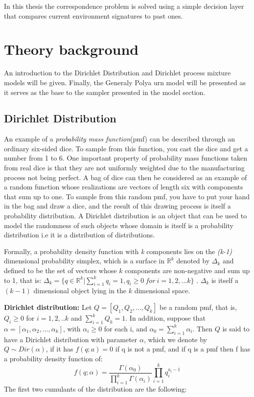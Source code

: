 \documentclass[twoside,hidelinks]{article}
\begin{document}
In this thesis the correspondence problem is solved using a simple decision layer that compares current environment signatures to past ones.


\newpage
\section{Theory background}
\label{sec:theory}


An introduction to the Dirichlet Distribution and Dirichlet process mixture models will be given. Finally, the Generaly Polya urn model will be presented as it serves as the base to the sampler presented in the model section.

\subsection{Dirichlet Distribution}

An example of a \textit{probability mass function}(pmf) can be described through an ordinary six-sided dice. To sample from this function, you cast the dice and get a number from 1 to 6. One important property of probability mass functions taken from real dice is that they are not uniformly weighted due to the manufacturing process not being perfect. A bag of dice can then be considered as an example of a random function whose realizations are vectors of length six with components that sum up to one. To sample from this random pmf, you have to put your hand in the bag and draw a dice, and the result of this drawing process is itself a probability distribution. A Dirichlet distribution is an object that can be used to model the randomness of such objects whose domain is itself is a probability distribution i.e it is a distribution of distributions.

Formally, a probability density function with \textit{k} components lies on the \textit{(k-1)} dimensional probability simplex, which is a surface in $ \mathbb{R}^k $ denoted by $ \Delta_k $ and defined to be the set of vectors whose $ k $  components are non-negative and sum up to 1, that is:  $ \Delta_k = \{ q \in  \mathbb{R}^k | \sum_{i=1}^k q_i=1, q_i \geq 0\ for\ i=1,2,...k \} $ . $ \Delta_k $  is itself a $ ( k-1 ) $ dimensional object lying in the $k$ dimensional space. 

\textbf{Dirichlet distribution:} Let $ Q = [Q_1,Q_2,...,Q_k  ] $ be a random pmf, that is, $ Q_i \geq 0 $ for $ i=1,2,..k $ and $ \sum_{i=1}^k Q_k=1 $. In addition, suppose that $ \alpha = [\alpha_1, \alpha_2, ..., \alpha_k ] $, with $ \alpha_i  \ge  0 $ for each i, and $ \alpha_0 = \sum_{i=1}^k \alpha_i $. Then $ Q $ is said to have a Dirichlet distribution with parameter $\alpha$, which we denote by $ Q \sim  Dir(\alpha)$, if it has $f(q;a) = 0$ if q is not a pmf, and if q is a pmf then f has a probability density function of:
\begin{equation}
 f(q; \alpha) = \frac{ \Gamma( \alpha_0)  }{ \prod_{i=1}^{k} \Gamma ( \alpha_i) } \prod_{i=1}^{k} q_i^{a_i -1}
\end{equation}
The first two cumulants of the distribution are the following:
\end{document}

